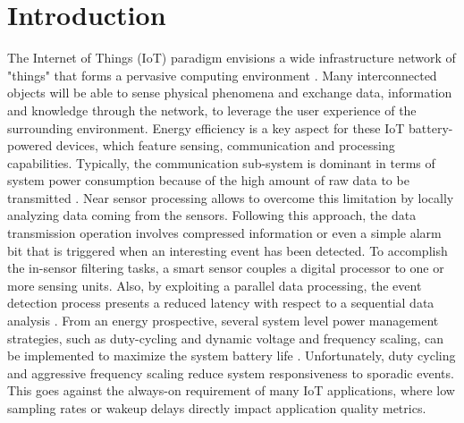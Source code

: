 \documentclass[journal]{IEEEtran}
\begin{document}
%
\IEEEpeerreviewmaketitle




\section{Introduction}
\label{intro}
The Internet of Things (IoT) paradigm envisions a wide infrastructure network of "things" that forms a pervasive computing environment \cite{Chen2014}. Many interconnected objects will be able to sense physical phenomena and exchange data, information and knowledge through the network, to leverage the user experience of the surrounding environment.
Energy efficiency is a key aspect for these IoT battery-powered devices, which feature sensing, communication and processing capabilities. 
Typically, the communication sub-system is dominant in terms of system power consumption because of the high amount of raw data to be transmitted \cite{deGroot2015}.
Near sensor processing allows to overcome this limitation by locally analyzing data coming from the sensors. Following this approach, the data transmission operation involves compressed information or even a simple alarm bit that is triggered when an interesting event has been detected. To accomplish the in-sensor filtering tasks, a smart sensor couples a digital processor to one or more sensing units. 
Also, by exploiting a parallel data processing, the event detection process presents a reduced latency with respect to a sequential data analysis \cite{Mayer2015}.
From an energy prospective, several system level power management strategies, such as duty-cycling and dynamic voltage and frequency scaling, can be implemented to maximize the system battery life \cite{Dargie2012, casamassima2013}.
Unfortunately, duty cycling and aggressive frequency scaling reduce system responsiveness to sporadic events. This goes against the always-on requirement of many IoT applications, where low sampling rates or wakeup delays directly impact application quality metrics. 
\end{document}
